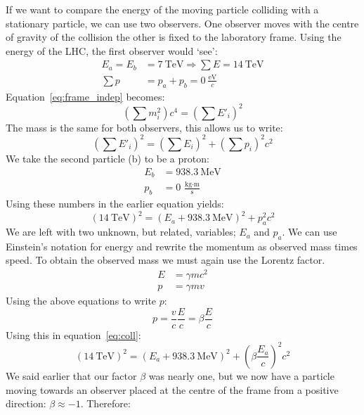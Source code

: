 If we want to compare the energy of the moving particle colliding with a stationary particle, we can use two observers. One observer moves with the centre of gravity of the collision the other is fixed to the laboratory frame. Using the energy of the LHC, the first observer would `see':
\begin{align}
E_a = E_b &= 7~\mbox{TeV} \Rightarrow \sum E = 14~\mbox{TeV} \\
\sum p &= p_a + p_b = 0~\frac{\mbox{eV}}{c}
\end{align}
Equation~\ref{eq:frame_indep} becomes:
\begin{equation}
\left(  \sum m_i^2 \right)  c^4 = \left(  \sum E'_i \right)^2
\end{equation}
The mass is the same for both observers, this allows us to write:
\begin{equation}
\left(  \sum E'_i \right)^2 = \left(  \sum E_i \right)^2 + \left(  \sum p_i \right)^2 c^2
\end{equation}
We take the second particle (b) to be a proton:
\begin{align}
E_b &= 938.3~\mbox{MeV} \\
p_b &= 0~\frac{\mbox{kg} \cdot \mbox{m}}{\mbox{s}}
\end{align}
Using these numbers in the earlier equation yields:
\begin{equation}
\left(  14~\mbox{TeV} \right)^2 = \left(  E_a + 938.3~\mbox{MeV} \right)^2 + p_a^2 c^2 \label{eq:coll}
\end{equation}
We are left with two unknown, but related, variables; $E_a$ and $p_a$. We can use Einstein's notation for energy and rewrite the momentum as observed mass times speed. To obtain the observed mass we must again use the Lorentz factor.
\begin{align}
E &= \gamma m c^2 \\
p &= \gamma m v
\end{align}
Using the above equations to write $p$:
\begin{equation}
p = \frac{v}{c}\frac{E}{c} = \beta \frac{E}{c}
\end{equation}
Using this in equation~\ref{eq:coll}:
\begin{equation}
\left(  14~\mbox{TeV} \right)^2 = \left(  E_a + 938.3~\mbox{MeV} \right)^2 + \left(  \beta \frac{E_a}{c} \right)^2 c^2 \label{eq:coll2}
\end{equation}
We said earlier that our factor $\beta$ was nearly one, but we now have a particle moving towards an observer placed at the centre of the frame from a positive direction: $\beta \approx -1$. Therefore:
